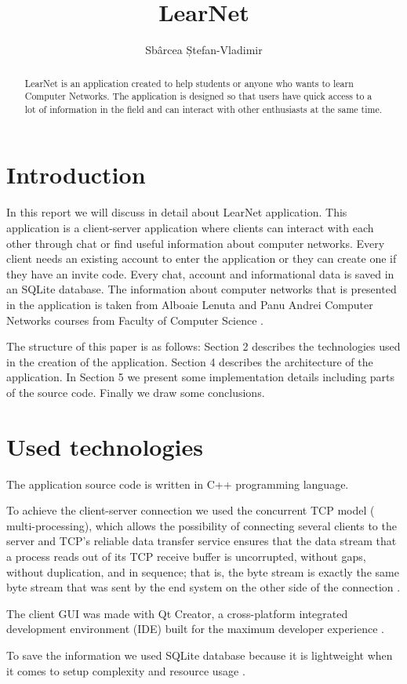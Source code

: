 \documentclass[runningheads]{llncs}
\title{LearNet}
\author{Sbârcea Ștefan-Vladimir}
\institute{ Faculty of Computer Science, Alexandru Ioan Cuza University of Iasi
\email{stefan.sbarcea@info.uaic.ro}}
\begin{document}
\maketitle

\begin{abstract}
LearNet is an application created to help students or anyone who wants to learn Computer Networks. The application is designed so that users have quick access to a lot of information in the field and can interact with other enthusiasts at the same time.
\end{abstract}


\section{Introduction}
\par In this report we will discuss in detail about LearNet application. This application is a client-server application where clients can interact with each other through chat or find useful information about computer networks. Every client needs an existing account to enter the application or they can create one if they have an invite code. Every chat, account and informational data is saved in an SQLite database. The information about computer networks that is presented in the application is taken from Alboaie Lenuta and Panu Andrei Computer Networks courses from Faculty of Computer Science \cite{computernetworks}.
\par The structure of this paper is as follows: Section 2 describes the technologies used in the creation of the application. Section 4 describes the architecture of the application. In Section 5 we present some implementation details including parts of the source code. Finally we draw some conclusions.

\section{Used technologies}
\par The application source code is written in C++ programming language.
\par To achieve the client-server connection we used the concurrent TCP model ( multi-processing), which allows the possibility of connecting several clients to the server and TCP’s reliable
data transfer service ensures that the data stream that a process reads out of its TCP receive buffer is uncorrupted, without gaps, without duplication, and in sequence; that is, the byte stream is exactly the same byte stream that was sent by the end system on the other side of the connection \cite{kurose1986computer}. 
\par The client GUI was made with Qt Creator, a cross-platform integrated development environment (IDE) built for the maximum developer experience \cite{qtcreator}. 
\par To save the information we used SQLite database because it is lightweight when it comes to setup complexity and resource usage \cite{kreibich2010using}. 
\end{document}
